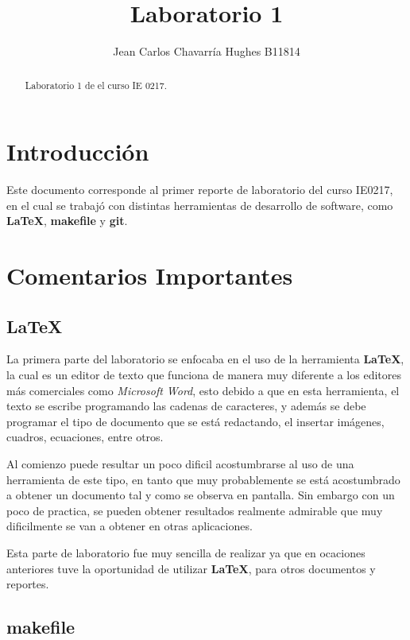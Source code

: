\documentclass{article}
\begin{document}
\title{Laboratorio 1}
\author{Jean Carlos Chavarr\' ia Hughes B11814}
\maketitle
\begin{abstract}
Laboratorio 1 de el curso IE 0217.
\end{abstract}
\section{Introducci\' on}
Este documento corresponde al primer reporte de laboratorio del curso IE0217, en el cual se trabaj\' o con distintas herramientas de desarrollo de software, como \textbf{LaTeX}, \textbf{makefile} y \textbf{git}. 

\section{Comentarios Importantes}

\subsection*{LaTeX}

La primera parte del laboratorio se enfocaba en el uso de la herramienta \textbf{LaTeX}, la cual es un editor de texto que funciona de manera muy diferente a los editores m\' as comerciales como \textit{Microsoft Word}, esto debido a que en esta herramienta, el texto se escribe programando las cadenas de caracteres, y adem\' as se debe programar el tipo de documento que se est\' a redactando, el insertar im\' agenes, cuadros, ecuaciones, entre otros.

\bigskip

Al comienzo puede resultar un poco dificil acostumbrarse al uso de una herramienta de este tipo, en tanto que muy probablemente se est\' a acostumbrado a obtener un documento tal y como se observa en pantalla. Sin embargo con un poco de practica, se pueden obtener resultados realmente admirable que muy dificilmente se van a obtener en otras aplicaciones. 

\bigskip

Esta parte de laboratorio fue muy sencilla de realizar ya que en ocaciones anteriores tuve la oportunidad de utilizar \textbf{LaTeX}, para otros documentos y reportes.

\subsection*{makefile}
\end{document}
